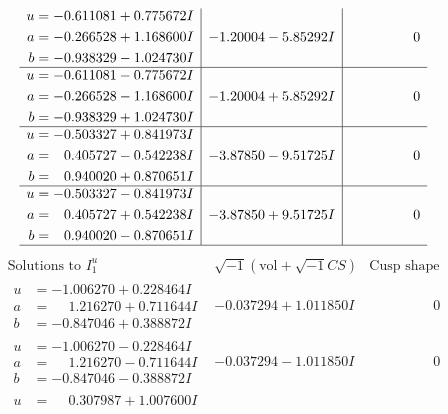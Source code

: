 \documentclass[1p]{elsarticle_modified}
\theoremstyle{definition}
\newcommand{\I}{\sqrt{-1}}
\begin{document}
$$\begin{array}{c|c|c}
\begin{aligned}
u &= -0.611081 + 0.775672 I \\
a &= -0.266528 + 1.168600 I \\
b &= -0.938329 - 1.024730 I\end{aligned}
 & -1.20004 - 5.85292 I & \phantom{-0.000000 } 0 \\ \hline\begin{aligned}
u &= -0.611081 - 0.775672 I \\
a &= -0.266528 - 1.168600 I \\
b &= -0.938329 + 1.024730 I\end{aligned}
 & -1.20004 + 5.85292 I & \phantom{-0.000000 } 0 \\ \hline\begin{aligned}
u &= -0.503327 + 0.841973 I \\
a &= \phantom{-}0.405727 - 0.542238 I \\
b &= \phantom{-}0.940020 + 0.870651 I\end{aligned}
 & -3.87850 - 9.51725 I & \phantom{-0.000000 } 0 \\ \hline\begin{aligned}
u &= -0.503327 - 0.841973 I \\
a &= \phantom{-}0.405727 + 0.542238 I \\
b &= \phantom{-}0.940020 - 0.870651 I\end{aligned}
 & -3.87850 + 9.51725 I & \phantom{-0.000000 } 0\\
 \hline 
 \end{array}$$\newpage$$\begin{array}{c|c|c}  
\text{Solutions to }I^u_{1}& \I (\text{vol} + \sqrt{-1}CS) & \text{Cusp shape}\\
 \hline 
\begin{aligned}
u &= -1.006270 + 0.228464 I \\
a &= \phantom{-}1.216270 + 0.711644 I \\
b &= -0.847046 + 0.388872 I\end{aligned}
 & -0.037294 + 1.011850 I & \phantom{-0.000000 } 0 \\ \hline\begin{aligned}
u &= -1.006270 - 0.228464 I \\
a &= \phantom{-}1.216270 - 0.711644 I \\
b &= -0.847046 - 0.388872 I\end{aligned}
 & -0.037294 - 1.011850 I & \phantom{-0.000000 } 0 \\ \hline\begin{aligned}
u &= \phantom{-}0.307987 + 1.007600 I \\

\end{aligned}
\end{array}$$
\end{document}
